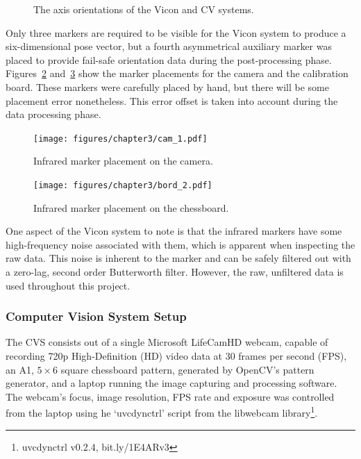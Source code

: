\begin{figure}
  \centering
  \def\svgwidth{0.5\textwidth}
  
  \caption{The axis orientations of the Vicon and CV systems.}
\label{fig:chap3-cam-vicon-axes}
\end{figure}

Only three markers are required to be visible for the Vicon system to produce a six-dimensional pose vector, but a fourth asymmetrical auxiliary marker was placed to provide fail-safe orientation data during the post-processing phase. Figures~\ref{fig:chap3-cam-marker-placement} and~\ref{fig:chap3-board-marker-placement} show the marker placements for the camera and the calibration board. These markers were carefully placed by hand, but there will be some placement error nonetheless. This error offset is taken into account during the data processing phase. 

\begin{figure}
   \centering 
   \texttt{[image: figures/chapter3/cam\_1.pdf]}
   \caption{Infrared marker placement on the camera.}
\label{fig:chap3-cam-marker-placement}
\end{figure}

\begin{figure}
   \centering 
   \texttt{[image: figures/chapter3/bord\_2.pdf]}
   \caption{Infrared marker placement on the chessboard.}
\label{fig:chap3-board-marker-placement}
\end{figure}

One aspect of the Vicon system to note is that the infrared markers have some high-frequency noise associated with them, which is apparent when inspecting the raw data. This noise is inherent to the marker and can be safely filtered out with a zero-lag, second order Butterworth filter. However, the raw, unfiltered data is used throughout this project. 

\subsubsection{Computer Vision System Setup}

The CVS consists out of a single Microsoft LifeCamHD webcam, capable of recording 720p High-Definition (HD) video data at 30 frames per second (FPS), an A1, $5\times6$ square chessboard pattern, generated by OpenCV's pattern generator, and a laptop running the image capturing and processing software. The webcam's focus, image resolution, FPS rate and exposure was controlled from the laptop using he `uvcdynctrl' script from the libwebcam library\footnote{uvcdynctrl v0.2.4, bit.ly/1E4ARv3}. 

